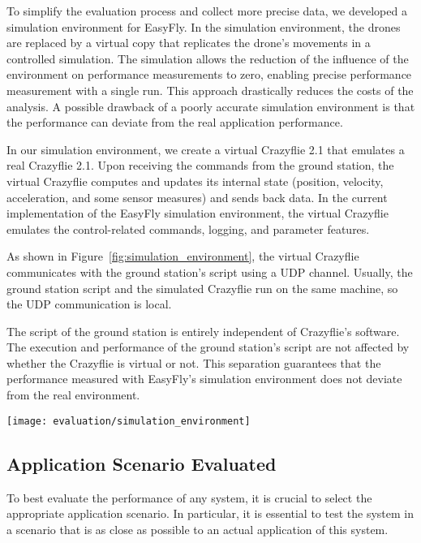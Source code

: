 To simplify the evaluation process and collect more precise data, we developed a simulation environment for EasyFly.
In the simulation environment, the drones are replaced by a virtual copy that replicates the drone's movements in a controlled simulation.
The simulation allows the reduction of the influence of the environment on performance measurements to zero, enabling precise performance measurement with a single run.
This approach drastically reduces the costs of the analysis.
A possible drawback of a poorly accurate simulation environment is that the performance can deviate from the real application performance.

In our simulation environment, we create a virtual Crazyflie 2.1 that emulates a real Crazyflie 2.1.
Upon receiving the commands from the ground station, the virtual Crazyflie computes and updates its internal state (position, velocity, acceleration, and some sensor measures) and sends back data.
In the current implementation of the EasyFly simulation environment, the virtual Crazyflie emulates the control-related commands, logging, and parameter features.

As shown in Figure~\ref{fig:simulation_environment}, the virtual Crazyflie communicates with the ground station's script using a UDP channel.
Usually, the ground station script and the simulated Crazyflie run on the same machine, so the UDP communication is local.

The script of the ground station is entirely independent of Crazyflie's software. 
The execution and performance of the ground station's script are not affected by whether the Crazyflie is virtual or not.
This separation guarantees that the performance measured with EasyFly's simulation environment does not deviate from the real environment.

\begin{SCfigure}[\sidecaptionrelwidth][tb]
    \texttt{[image: evaluation/simulation\_environment]}
    \caption{Structure of EasyFly simulation environment.}\label{fig:simulation_environment}
\end{SCfigure}


\subsection{Application Scenario Evaluated}\label{subsec:application_scenario_evaluated}
To best evaluate the performance of any system, it is crucial to select the appropriate application scenario.
In particular, it is essential to test the system in a scenario that is as close as possible to an actual application of this system.


